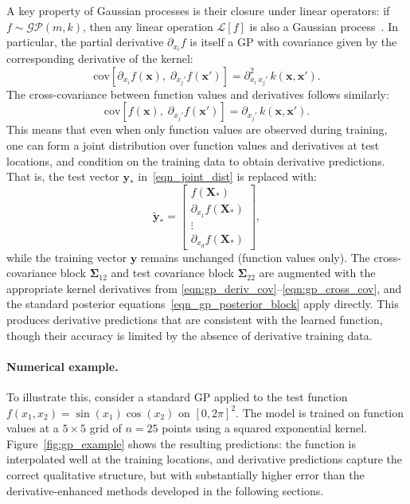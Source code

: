 \documentclass[12pt]{article}
\begin{document}
A key property of Gaussian processes is their closure under linear operators: if $f \sim \mathcal{GP}(m, k)$, then any linear operation $\mathcal{L}[f]$ is also a Gaussian process~\cite{rasmussen2006gaussian}. In particular, the partial derivative $\partial_{x_i} f$ is itself a GP with covariance given by the corresponding derivative of the kernel:
\begin{equation}
	\label{eqn:gp_deriv_cov}
	\mathrm{cov}\!\left[\partial_{x_i} f(\mathbf{x}),\; \partial_{x_j'} f(\mathbf{x}')\right] = \partial^2_{x_i\, x_j'}\, k(\mathbf{x}, \mathbf{x}').
\end{equation}
The cross-covariance between function values and derivatives follows similarly:
\begin{equation}
	\label{eqn:gp_cross_cov}
	\mathrm{cov}\!\left[f(\mathbf{x}),\; \partial_{x_j'} f(\mathbf{x}')\right] = \partial_{x_j'}\, k(\mathbf{x}, \mathbf{x}').
\end{equation}
This means that even when only function values are observed during training, one can form a joint distribution over function values and derivatives at test locations, and condition on the training data to obtain derivative predictions. That is, the test vector $\mathbf{y}_*$ in~\eqref{eqn_joint_dist} is replaced with:
\begin{equation}
	\label{eqn:gp_aug_test}
	\tilde{\mathbf{y}}_* = \begin{bmatrix} f(\mathbf{X}_*) \\ \partial_{x_1} f(\mathbf{X}_*) \\ \vdots \\ \partial_{x_d} f(\mathbf{X}_*) \end{bmatrix},
\end{equation}
while the training vector $\mathbf{y}$ remains unchanged (function values only). The cross-covariance block $\boldsymbol{\Sigma}_{12}$ and test covariance block $\boldsymbol{\Sigma}_{22}$ are augmented with the appropriate kernel derivatives from \eqref{eqn:gp_deriv_cov}--\eqref{eqn:gp_cross_cov}, and the standard posterior equations~\eqref{eqn_gp_posterior_block} apply directly. This produces derivative predictions that are consistent with the learned function, though their accuracy is limited by the absence of derivative training data.

\paragraph{Numerical example.}
To illustrate this, consider a standard GP applied to the test function $f(x_1, x_2) = \sin(x_1)\cos(x_2)$ on $[0, 2\pi]^2$. The model is trained on function values at a $5 \times 5$ grid of $n = 25$ points using a squared exponential kernel. Figure~\ref{fig:gp_example} shows the resulting predictions: the function is interpolated well at the training locations, and derivative predictions capture the correct qualitative structure, but with substantially higher error than the derivative-enhanced methods developed in the following sections.
\end{document}
